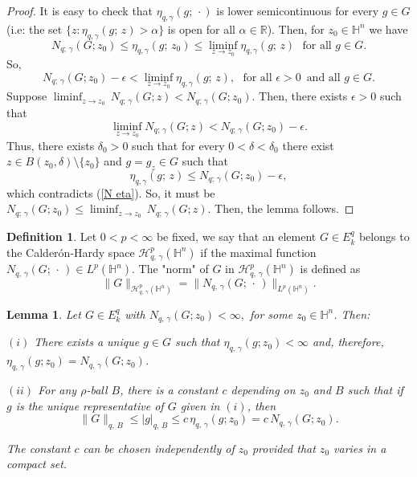 \documentclass[reqno,10pt]{article}
\newtheorem{lemma}[theorem]{Lemma}
\theoremstyle{definition}
\newtheorem{definition}[theorem]{Definition}
\numberwithin{equation}{section}
\numberwithin{theorem}{section}
\begin{document}
\begin{proof}
It is easy to check that $\eta_{q, \gamma}(g; \, \cdot)$ is lower semicontinuous for every $g \in G$ 
(i.e: the set $\{ z : \eta_{q, \gamma}(g; \, z) > \alpha \}$ is open for all $\alpha \in \mathbb{R}$). Then, 
for $z_0 \in \mathbb{H}^n$ we have 
\[
N_{q; \, \gamma}(G; z_0) \leq \eta_{q, \gamma}(g; \, z_0) \leq \liminf_{z \to z_0} \eta_{q, \gamma}(g; \, z) \,\,\,\, \text{for all} \,\, 
g \in G.
\]
So,
\begin{equation} \label{N eta}
N_{q; \, \gamma}(G; z_0) - \epsilon < \liminf_{z \to z_0} \eta_{q, \gamma}(g; \, z), \,\,\,\, \text{for all} \,\, \epsilon > 0 \,\,\, 
\text{and all} \,\, g \in G.
\end{equation}
Suppose $\displaystyle{\liminf_{z \to z_0}} \, N_{q; \, \gamma}(G; z) < N_{q; \, \gamma}(G; z_0)$. Then, there exists $\epsilon >0$ such that
\[
\liminf_{z \to z_0} N_{q; \, \gamma}(G; z) < N_{q; \, \gamma}(G; z_0) - \epsilon.
\]
Thus, there exists $\delta_0 > 0$ such that for every $0 < \delta < \delta_0$ there exist $z \in B(z_0, \delta) \setminus \{ z_0 \}$ and 
$g = g_z \in G$ such that
\[
\eta_{q, \gamma}(g; \, z) \leq N_{q; \, \gamma}(G; z_0) - \epsilon,
\]
which contradicts (\ref{N eta}). So, it must be 
$N_{q; \, \gamma}(G; z_0) \leq \displaystyle{\liminf_{z \to z_0}} \, N_{q; \, \gamma}(G; z)$. Then, the lemma follows.
\end{proof}

\begin{definition}
Let $0 < p < \infty$ be fixed, we say that an element $G \in E^{q}_{k}$ belongs to the Calder\'on-Hardy space
$\mathcal{H}^{p}_{q, \, \gamma}(\mathbb{H}^{n})$ if the maximal function $N_{q, \, \gamma}(G; \, \cdot \,) \in L^{p}(\mathbb{H}^{n})$. 
The "norm" of $G$ in $\mathcal{H}^{p}_{q, \, \gamma}(\mathbb{H}^{n})$ is defined as 
\[
\| G \|_{\mathcal{H}^{p}_{q, \, \gamma}(\mathbb{H}^{n})} = \| N_{q, \, \gamma}(G; \, \cdot \,) \|_{L^p(\mathbb{H}^{n})}.
\]
\end{definition}


\begin{lemma} \label{puntual 1} Let $G \in E^{q}_{k}$ with $N_{q, \, \gamma}(G; z_0) < \infty,$ for some $z_0 \in \mathbb{H}^{n}$. Then:

$(i)$ There exists a unique $g \in G$ such that $\eta_{q, \, \gamma} (g; z_0) < \infty$ and, therefore, 
$\eta_{q, \, \gamma} (g; z_0) = N_{q, \, \gamma}(G; z_0)$.

$(ii)$ For any $\rho$-ball $B$, there is a constant $c$ depending on $z_0$ and $B$ such that if $g$ is the unique representative of $G$ given in $(i)$, then
\[
\|G\|_{q, \, B} \leq |g|_{q, \, B} \leq c \, \eta_{q, \, \gamma} (g; z_0) = c \, N_{q, \, \gamma}(G; z_0).
\]

The constant $c$ can be chosen independently of $z_0$ provided that $z_0$ varies in a compact set.
\end{lemma}
\end{document}
